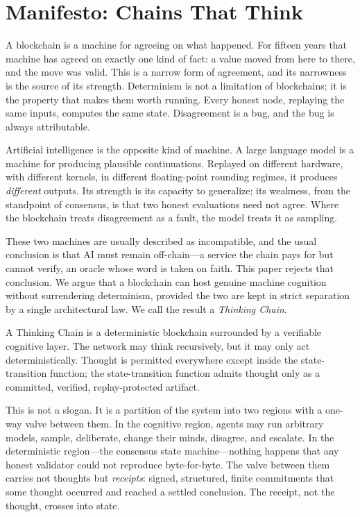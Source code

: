 \section{Manifesto: Chains That Think}
\label{sec:manifesto}

A blockchain is a machine for agreeing on what happened. For fifteen years that machine has agreed on exactly one kind of fact: a value moved from here to there, and the move was valid. This is a narrow form of agreement, and its narrowness is the source of its strength. Determinism is not a limitation of blockchains; it is the property that makes them worth running. Every honest node, replaying the same inputs, computes the same state. Disagreement is a bug, and the bug is always attributable.

Artificial intelligence is the opposite kind of machine. A large language model is a machine for producing plausible continuations. Replayed on different hardware, with different kernels, in different floating-point rounding regimes, it produces \emph{different} outputs. Its strength is its capacity to generalize; its weakness, from the standpoint of consensus, is that two honest evaluations need not agree. Where the blockchain treats disagreement as a fault, the model treats it as sampling.

These two machines are usually described as incompatible, and the usual conclusion is that AI must remain off-chain---a service the chain pays for but cannot verify, an oracle whose word is taken on faith. This paper rejects that conclusion. We argue that a blockchain can host genuine machine cognition without surrendering determinism, provided the two are kept in strict separation by a single architectural law. We call the result a \emph{Thinking Chain}.

\begin{principle}
A Thinking Chain is a deterministic blockchain surrounded by a verifiable cognitive layer. The network may think recursively, but it may only act deterministically. Thought is permitted everywhere except inside the state-transition function; the state-transition function admits thought only as a committed, verified, replay-protected artifact.
\end{principle}

This is not a slogan. It is a partition of the system into two regions with a one-way valve between them. In the cognitive region, agents may run arbitrary models, sample, deliberate, change their minds, disagree, and escalate. In the deterministic region---the consensus state machine---nothing happens that any honest validator could not reproduce byte-for-byte. The valve between them carries not thoughts but \emph{receipts}: signed, structured, finite commitments that some thought occurred and reached a settled conclusion. The receipt, not the thought, crosses into state.

